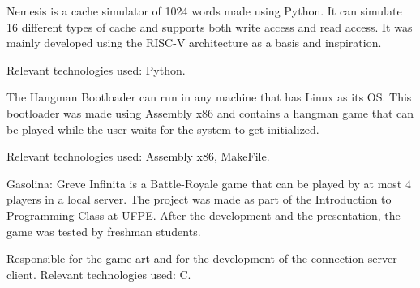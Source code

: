 \documentclass[]{deedy-resume-openfont}
\begin{document}
\begin{minipage}[t]{0.66\textwidth}
\begin{tightemize}
\item {Nemesis is a cache simulator of 1024 words made using Python. It can simulate 16 different types of cache and supports both write access and read access. It was mainly developed using the RISC-V architecture as a basis and inspiration.}
\item {Relevant technologies used: Python.}
\end{tightemize}

\begin{tightemize}
\item {The Hangman Bootloader can run in any machine that has Linux as its OS. This bootloader was made using Assembly x86 and contains a hangman game that can be played while the user waits for the system to get initialized.}
\item {Relevant technologies used: Assembly x86, MakeFile.}
\end{tightemize}

\begin{tightemize}
\item {Gasolina: Greve Infinita is a Battle-Royale game that can be played by at most 4 players in a local server. The project was made as part of the Introduction to Programming Class at UFPE. After the development and the presentation, the game was tested by freshman students.}
\item {Responsible for the game art and for the development of the connection server-client. Relevant technologies used: C.}
\end{tightemize}



\end{minipage}
\end{document}
